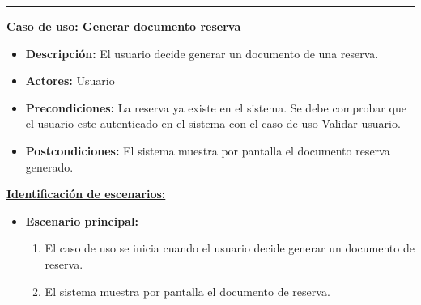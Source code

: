 \smallskip
\hrule height 1pt
\smallskip
\textbf{Caso de uso: Generar documento reserva}
\begin{itemize}\renewcommand{\labelitemi}{$\cdot$}
 \item \textbf{Descripción:} El usuario decide generar un documento de una reserva.
  \item \textbf{Actores:} Usuario
  \item \textbf{Precondiciones:} La reserva ya existe en el sistema. Se debe comprobar que el usuario este autenticado en el sistema con el caso de uso Validar usuario.
  \item \textbf{Postcondiciones:} El sistema muestra por pantalla el documento reserva generado.
\end{itemize}
\underline{\textbf{Identificación de escenarios:}}
\begin{itemize}\renewcommand{\labelitemi}{$\circ$}
 \item \textbf{Escenario principal:}
         \begin{enumerate}
          \item El caso de uso se inicia cuando el usuario decide generar un documento de reserva.
	  \item El sistema muestra por pantalla el documento de reserva.
         \end{enumerate}
\end{itemize}

